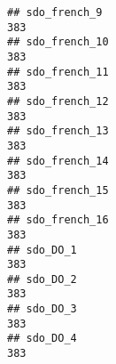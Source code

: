 \documentclass[
]{article}
\begin{document}
\begin{verbatim}
## sdo_french_9                                                                                                                                                                                                               383
## sdo_french_10                                                                                                                                                                                                              383
## sdo_french_11                                                                                                                                                                                                              383
## sdo_french_12                                                                                                                                                                                                              383
## sdo_french_13                                                                                                                                                                                                              383
## sdo_french_14                                                                                                                                                                                                              383
## sdo_french_15                                                                                                                                                                                                              383
## sdo_french_16                                                                                                                                                                                                              383
## sdo_DO_1                                                                                                                                                                                                                   383
## sdo_DO_2                                                                                                                                                                                                                   383
## sdo_DO_3                                                                                                                                                                                                                   383
## sdo_DO_4                                                                                                                                                                                                                   383

\end{verbatim}
\end{document}
